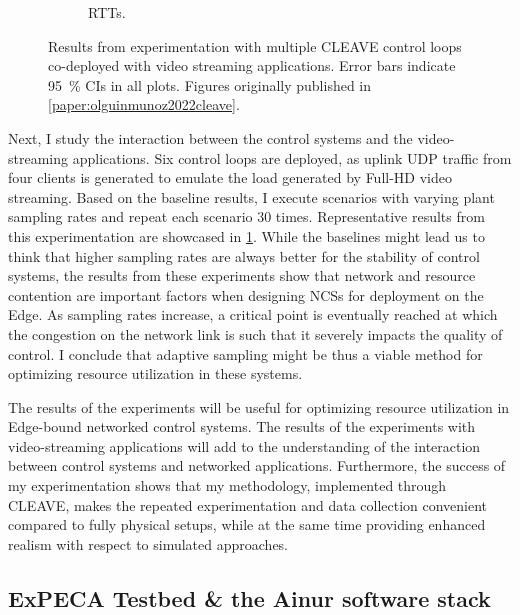 \begin{figure}[t]
\begin{subfigure}[t]{.45\textwidth}
        \caption{\glspl{RTT}.}%
    \end{subfigure}%
    \caption{
        Results from experimentation with multiple \gls{CLEAVE} control loops co-deployed with video streaming applications.
        Error bars indicate \SI{95}{\percent} \glspl{CI} in all plots.
        Figures originally published in \cref{paper:olguinmunoz2022cleave}.
    }\label{fig:cleaveresults}
\end{figure}

Next, I study the interaction between the control systems and the video-streaming applications.
Six control loops are deployed, as uplink \gls{UDP} traffic from four clients is generated to emulate the load generated by Full-HD video streaming.
Based on the baseline results, I execute scenarios with varying plant sampling rates and repeat each scenario \num{30} times.
Representative results from this experimentation are showcased in \cref{fig:cleaveresults}.
While the baselines might lead us to think that higher sampling rates are always better for the stability of control systems, the results from these experiments show that network and resource contention are important factors when designing \glspl{NCS} for deployment on the Edge.
As sampling rates increase, a critical point is eventually reached at which the congestion on the network link is such that it severely impacts the quality of control.
I conclude that adaptive sampling might be thus a viable method for optimizing resource utilization in these systems.

The results of the experiments will be useful for optimizing resource utilization in Edge-bound networked control systems.
The results of the experiments with video-streaming applications will add to the understanding of the interaction between control systems and networked applications.
Furthermore, the success of my experimentation shows that my methodology, implemented through \gls{CLEAVE}, makes the repeated experimentation and data collection convenient compared to fully physical setups, while at the same time providing enhanced realism with respect to simulated approaches.

\subsection{ExPECA Testbed \& the Ainur software stack}\label{sec:testbed}

